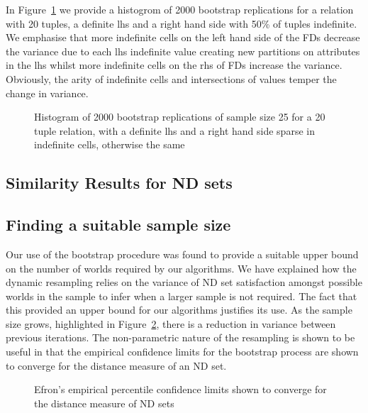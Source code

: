 \smallskip

In Figure~\ref{graph:cp_hist1} we provide a histogrom of
2000 bootstrap replications for a relation with 20 tuples, a
definite lhs and a right hand side with 50\% of tuples indefinite.
We emphasise that more indefinite cells on the left hand side of the
FDs decrease the variance due to each lhs indefinite value creating
new partitions on attributes in the lhs whilst more indefinite cells
on the rhs of FDs increase the variance. Obviously, the arity of
indefinite cells and intersections of values temper the change in
variance. 


\begin{figure}
\centerline{}
\caption{\label{graph:cp_hist1}\scriptsize{Histogram of 2000 bootstrap replications of sample size 25 for a 20 tuple relation, with a definite lhs and a
right hand side sparse in indefinite cells, otherwise the same}}
\end{figure}

\subsection{Similarity Results for ND sets}

\subsection{Finding a suitable sample size}

Our use of the bootstrap procedure was found to provide a suitable
upper bound on the number of worlds required by our algorithms. We
have explained how the dynamic resampling relies on the variance of ND
set satisfaction amongst possible worlds in the sample to infer when a
larger sample is not required.  The fact that this provided an upper
bound for our algorithms justifies its use. 
As the sample size grows, highlighted in
Figure~\ref{graph:conlim}, there is a reduction in variance between
previous iterations. The non-parametric nature of the resampling is
shown to be useful in that the empirical confidence limits for
the bootstrap process are
shown to converge for the distance measure of an ND set.


\begin{figure}
\centerline{}
\caption{\label{graph:conlim}\scriptsize{Efron's empirical percentile
 confidence limits shown to converge for the distance measure of ND sets}}
\end{figure}


